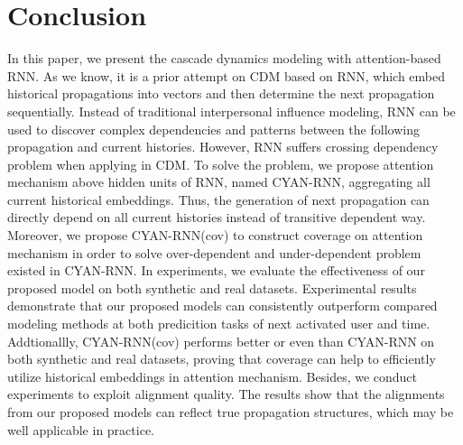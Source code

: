 \section{Conclusion}

In this paper, we present the cascade dynamics modeling with attention-based
RNN. As we know, it is a prior attempt on CDM based on RNN, which embed
historical propagations into vectors and then determine the next propagation sequentially. 
Instead of traditional interpersonal influence modeling, RNN can
be used to discover complex dependencies and patterns between the following
propagation and current histories. 
However, RNN suffers crossing dependency problem when applying
in CDM. To solve the problem, we propose attention mechanism
above hidden units of RNN, named CYAN-RNN, aggregating all current historical
embeddings. Thus, the generation of next propagation can directly depend on all
current histories instead of transitive dependent way. Moreover, we propose
CYAN-RNN(cov) to construct coverage on attention mechanism in order to solve
over-dependent and under-dependent problem existed in CYAN-RNN. In experiments,
we evaluate the effectiveness of our proposed model on both synthetic and real
datasets. Experimental results demonstrate that our proposed models can
consistently outperform compared modeling methods at both predicition tasks of
next activated user and time. Addtionallly, CYAN-RNN(cov) performs
better or even than CYAN-RNN on both synthetic and real datasets, proving that
coverage can help to efficiently utilize historical embeddings in attention
mechanism. Besides, we conduct experiments to exploit alignment quality. The
results show that the alignments from our proposed models can reflect
true propagation structures, which may be well applicable in practice.

% 

